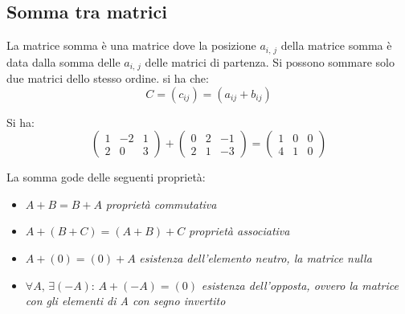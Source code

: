\documentclass[a4paper,12pt, oneside]{book}
\begin{document}
\subsection{Somma tra matrici}
La matrice somma è una matrice dove la posizione $a_{i,\,j}$ della matrice somma è data dalla somma delle $a_{i,\,j}$ delle matrici di partenza. Si possono sommare solo due matrici dello stesso ordine. si ha che:
$$C=(c_{ij})=(a_{ij}+b_{ij})$$
\begin{esempio}
Si ha:\\
$$\left(\begin{matrix}
1 & -2 & 1\\
2 & 0 & 3
\end{matrix}\right)+\left(\begin{matrix}
0 & 2 & -1\\
2 & 1 & -3
\end{matrix}\right)=\left(\begin{matrix}
1 & 0 & 0\\
4 & 1 & 0
\end{matrix}\right)$$
\end{esempio}
La somma gode delle seguenti proprietà:
\begin{itemize}
\item $A+B=B+A$ \textit{proprietà commutativa}
\item $A+(B+C)=(A+B)+C$ \textit{proprietà associativa}
\item $A+(0)=(0)+A$ \textit{esistenza dell'elemento neutro, la matrice nulla}
\item $\forall A,\, \exists (-A):\, A+(-A)=(0)$ \textit{esistenza dell'opposta, ovvero la matrice con gli elementi di A con segno invertito}
\end{itemize}
\newpage
\end{document}
